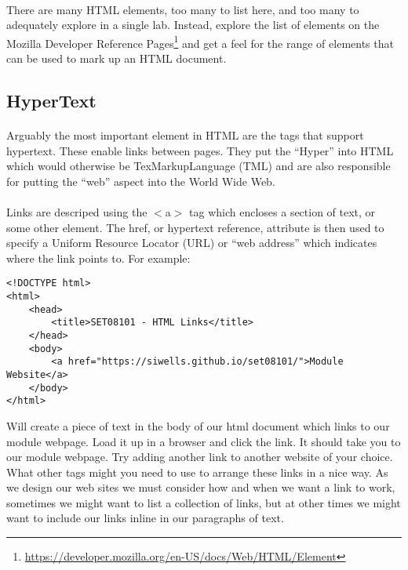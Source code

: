 \documentclass[10pt, a4paper]{article}
\begin{document}
\paragraph{} There are many HTML elements, too many to list here, and too many to adequately explore in a single lab. Instead, explore the list of elements on the Mozilla Developer Reference Pages\footnote{\url{https://developer.mozilla.org/en-US/docs/Web/HTML/Element}} and get a feel for the range of elements that can be used to mark up an HTML document.

\subsection{HyperText}
\paragraph{} Arguably the most important element in HTML are the tags that support hypertext. These enable links between pages. They put the ``Hyper'' into HTML which would otherwise be TexMarkupLanguage (TML) and are also responsible for putting the ``web'' aspect into the World Wide Web.

\paragraph{} Links are descriped using the $<$a$>$ tag which encloses a section of text, or some other element. The href, or hypertext reference, attribute is then used to specify a Uniform Resource Locator (URL) or ``web address'' which indicates where the link points to. For example:

\begin{lstlisting}
<!DOCTYPE html>
<html>
    <head>
        <title>SET08101 - HTML Links</title>
    </head>
    <body>
        <a href="https://siwells.github.io/set08101/">Module Website</a>        
    </body>
</html>
\end{lstlisting}
Will create a piece of text in the body of our html document which links to our module webpage. Load it up in a browser and click the link. It should take you to our module webpage. Try adding another link to another website of your choice. What other tags might you need to use to arrange these links in a nice way. As we design our web sites we must consider how and when we want a link to work, sometimes we might want to list a collection of links, but at other times we might want to include our links inline in our paragraphs of text.
\end{document}
